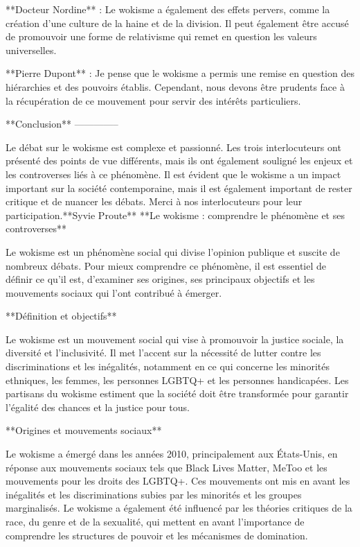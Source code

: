 **Docteur Nordine** : Le wokisme a également des effets pervers, comme la création d'une culture de la haine et de la division. Il peut également être accusé de promouvoir une forme de relativisme qui remet en question les valeurs universelles.

**Pierre Dupont** : Je pense que le wokisme a permis une remise en question des hiérarchies et des pouvoirs établis. Cependant, nous devons être prudents face à la récupération de ce mouvement pour servir des intérêts particuliers.

**Conclusion**
--------------

Le débat sur le wokisme est complexe et passionné. Les trois interlocuteurs ont présenté des points de vue différents, mais ils ont également souligné les enjeux et les controverses liés à ce phénomène. Il est évident que le wokisme a un impact important sur la société contemporaine, mais il est également important de rester critique et de nuancer les débats. Merci à nos interlocuteurs pour leur participation.**Syvie Proute**
**Le wokisme : comprendre le phénomène et ses controverses**

Le wokisme est un phénomène social qui divise l'opinion publique et suscite de nombreux débats. Pour mieux comprendre ce phénomène, il est essentiel de définir ce qu'il est, d'examiner ses origines, ses principaux objectifs et les mouvements sociaux qui l'ont contribué à émerger.

**Définition et objectifs**

Le wokisme est un mouvement social qui vise à promouvoir la justice sociale, la diversité et l'inclusivité. Il met l'accent sur la nécessité de lutter contre les discriminations et les inégalités, notamment en ce qui concerne les minorités ethniques, les femmes, les personnes LGBTQ+ et les personnes handicapées. Les partisans du wokisme estiment que la société doit être transformée pour garantir l'égalité des chances et la justice pour tous.

**Origines et mouvements sociaux**

Le wokisme a émergé dans les années 2010, principalement aux États-Unis, en réponse aux mouvements sociaux tels que Black Lives Matter, MeToo et les mouvements pour les droits des LGBTQ+. Ces mouvements ont mis en avant les inégalités et les discriminations subies par les minorités et les groupes marginalisés. Le wokisme a également été influencé par les théories critiques de la race, du genre et de la sexualité, qui mettent en avant l'importance de comprendre les structures de pouvoir et les mécanismes de domination.

